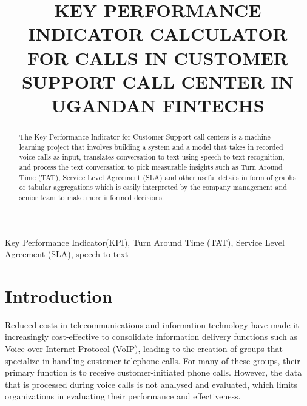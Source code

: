 \documentclass[conference]{IEEEtran}
\begin{document}
\title{KEY PERFORMANCE INDICATOR CALCULATOR FOR CALLS IN CUSTOMER SUPPORT CALL CENTER IN UGANDAN FINTECHS\\}

\author{
\and
{}
}

\maketitle

\begin{abstract}
The Key Performance Indicator for Customer Support call centers is a machine learning project that involves building a system and a model that takes in recorded voice calls as input, translates conversation to text using speech-to-text recognition, and process the text conversation to pick measurable insights such as Turn Around Time (TAT), Service Level Agreement (SLA) and other useful details in form of graphs or tabular aggregations which is easily interpreted by the company management and senior team to make more informed decisions.
\end{abstract}

\begin{IEEEkeywords}
Key Performance Indicator(KPI), Turn Around Time (TAT), Service Level Agreement (SLA), speech-to-text
\end{IEEEkeywords}

\section{Introduction}
Reduced costs in telecommunications and information technology have made it increasingly cost-effective to consolidate information delivery functions such as Voice over Internet Protocol (VoIP), leading to the creation of groups that specialize in handling customer telephone calls. For many of these groups, their primary function is to receive customer-initiated phone calls. However, the data that is processed during voice calls is not analysed and evaluated, which limits organizations in evaluating their performance and effectiveness.
\end{document}
